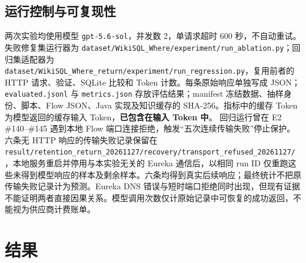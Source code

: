 \documentclass[conference]{IEEEtran}
\begin{document}
\subsection{运行控制与可复现性}
两次实验均使用模型 \texttt{gpt-5.6-sol}，并发数 2，单请求超时 600 秒，不自动重试。失败修复集运行器为 \texttt{dataset/\allowbreak{}WikiSQL\_Where/\allowbreak{}experiment/\allowbreak{}run\_ablation.py}；回归集适配器为 \texttt{dataset/\allowbreak{}WikiSQL\_Where\_return/\allowbreak{}experiment/\allowbreak{}run\_regression.py}，复用前者的 HTTP 请求、验证、SQLite 比较和 Token 计数。每条原始响应单独写成 JSON；\texttt{evaluated.jsonl} 与 \texttt{metrics.json} 存放评估结果；manifest 冻结数据、抽样身份、脚本、Flow JSON、Java 实现及知识缓存的 SHA-256。指标中的缓存 Token 为模型返回的缓存输入 Token，\textbf{已包含在输入 Token 中}。
回归运行曾在 E2 \#140–\#145 遇到本地 Flow 端口连接拒绝，触发“五次连续传输失败”停止保护。六条无 HTTP 响应的传输失败记录保留在 \texttt{result/\allowbreak{}retention\_return\_20261127/\allowbreak{}recovery/\allowbreak{}transport\_refused\_20261127/\allowbreak{}}，本地服务重启并停用与本实验无关的 Eureka 通信后，以相同 run ID 仅重跑这些未得到模型响应的样本及剩余样本。六条均得到真实后续响应；最终统计不把原传输失败记录计为预测。Eureka DNS 错误与短时端口拒绝同时出现，但现有证据不能证明两者直接因果关系。模型调用次数仅计原始记录中可恢复的成功返回，不能视为供应商计费账单。
\section{结果}
\end{document}
